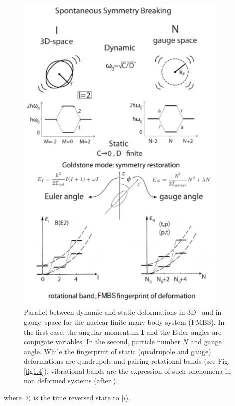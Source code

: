 \begin{figure}
\centerline{\includegraphics*[width=0.9\textwidth,angle=0]{nutshell/figs/fig1D1.pdf}}
\caption{Parallel between dynamic and static deformations in 3D-- and in gauge--space for the nuclear finite many body system (FMBS). In the first case, the angular momentum $\mathbf{I}$ and the Euler angles are conjugate variables. In the second, particle number $N$ and gauge angle. While the fingerprint of static (quadrupole and gauge) deformations are quadrupole and pairing rotational bands (see Fig. \ref{fig1.4}), vibrational bands are the expression of such phenomena in non deformed systems (after \cite{Broglia:73}).}\label{fig1D1}
\end{figure}
where $|\tilde i\rangle$  is the time reversed state to  $| i\rangle$.


